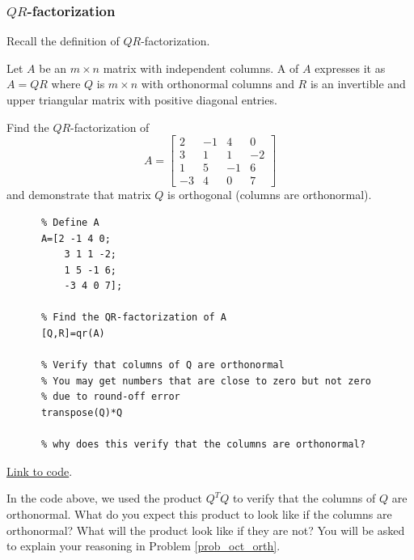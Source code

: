 \documentclass{ximera}
\begin{document}
\subsubsection*{$QR$-factorization}
 
Recall the definition of $QR$-factorization.
\begin{definition}[\ref{def:QR-factorization}]
Let $A$ be an $m \times n$ matrix with independent columns. A  of $A$ expresses it as $A = QR$ where $Q$ is $m \times n$ with orthonormal columns and $R$ is an invertible and upper triangular matrix with positive diagonal entries.
\end{definition}
 
\begin{example}\label{ex:qrOrthonormalQ}
Find the $QR$-factorization of
$$A=\begin{bmatrix}2 & -1 & 4 & 0\\
    3 & 1 & 1 & -2\\
    1 & 5 & -1 & 6\\
    -3 & 4 & 0 & 7\end{bmatrix}$$
and demonstrate that matrix $Q$ is orthogonal (columns are orthonormal).    
\begin{explanation}
    \begin{verbatim}
      % Define A
      A=[2 -1 4 0;
          3 1 1 -2;
          1 5 -1 6;
          -3 4 0 7];
       
      % Find the QR-factorization of A
      [Q,R]=qr(A)
       
      % Verify that columns of Q are orthonormal
      % You may get numbers that are close to zero but not zero
      % due to round-off error
      transpose(Q)*Q
 
      % why does this verify that the columns are orthonormal?
    \end{verbatim}
   
\href{https://sagecell.sagemath.org/?z=eJxdj8tqwzAQRfcG_8PdBJJSQZ30sSihGEr3yqJQQhaKPaoFtqYdSy3O11eKUyiVVpc5Z7izwDNZ5wl1WdTb_Rqqwi1uHssC6W1Qpa_Wl1jhLs_vL1FtMoqHQ8plscCL8y1CR9A7ZU0TWNzJBMcebPP-vb7eHbafsqxXs_BK4uyUFBPQcB8HP2ZUwwiBJXTsWQbTZ_aNIwYz4Z0CfByOJOMsZrbpeSQExomEcYwJ4XAOWW3jeSYcfavYWpAIS1kEMX78SOZSr670XOm7m9Ay5d1uxNefgvmw35L_-j39ACBmYSg=&lang=octave&interacts=eJyLjgUAARUAuQ==}{Link to code}.
\end{explanation} 
 
\begin{question}
In the code above, we used the product $Q^TQ$ to verify that the columns of $Q$ are orthonormal.  What do you expect this product to look like if the columns are orthonormal?  What will the product look like if they are not?  You will be asked to explain your reasoning in Problem \ref{prob_oct_orth}.
\end{question}
 
\end{example}
 
\end{document}
